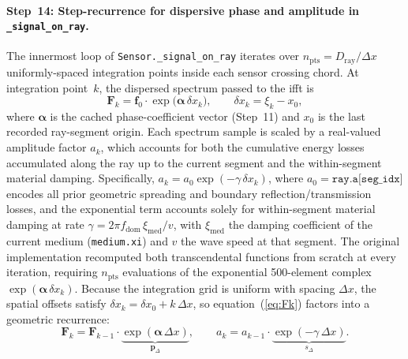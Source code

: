             \paragraph*{Step~14: Step-recurrence for dispersive phase and amplitude in \texttt{\_signal\_\allowbreak on\_ray}.}
            The innermost loop of \texttt{Sensor.\_signal\_on\_ray} iterates over $n_\mathrm{pts} = D_\mathrm{ray}/\Delta x$ uniformly-spaced integration points inside each sensor crossing chord. At integration point~$k$, the dispersed spectrum passed to the \acrfull{ifft} is
            \begin{equation}
              \mathbf{F}_k = \mathbf{f}_0
                \cdot\exp\!\bigl(\boldsymbol{\alpha}\,\delta x_k\bigr),
              \qquad \delta x_k = \xi_k - x_0,
              \label{eq:Fk}
            \end{equation}
            where $\boldsymbol{\alpha}$ is the cached phase-coefficient vector (Step~11) and $x_0$ is the last recorded ray-segment origin. Each spectrum sample is scaled by a real-valued amplitude factor $a_k$, which accounts for both the cumulative energy losses accumulated along the ray up to the current segment and the within-segment material damping. Specifically, $a_k = a_0\exp(-\gamma\,\delta x_k)$, where $a_0 = \texttt{ray.a[seg\_idx]}$ encodes all prior geometric spreading and boundary reflection/transmission losses, and the exponential term accounts solely for within-segment material damping at rate $\gamma = 2\pi f_\mathrm{dom}\,\xi_\mathrm{med}/v$, with $\xi_\mathrm{med}$ the damping coefficient of the current medium (\texttt{medium.xi}) and $v$ the wave speed at that segment. The original implementation recomputed both transcendental functions from scratch at every iteration, requiring $n_\mathrm{pts}$ evaluations of the exponential 500-element complex $\exp(\boldsymbol{\alpha}\,\delta x_k)$.
            Because the integration grid is uniform with spacing $\Delta x$, the spatial offsets satisfy $\delta x_k = \delta x_0 + k\,\Delta x$, so equation~(\ref{eq:Fk}) factors into a geometric recurrence:
            \begin{equation}
              \mathbf{F}_k
                = \mathbf{F}_{k-1}
                  \cdot \underbrace{\exp(\boldsymbol{\alpha}\,\Delta x)}_{\mathbf{p}_\Delta},
              \qquad
              a_k = a_{k-1}
                  \cdot \underbrace{\exp(-\gamma\,\Delta x)}_{s_\Delta}.
              \label{eq:step_recurrence}
            \end{equation}
